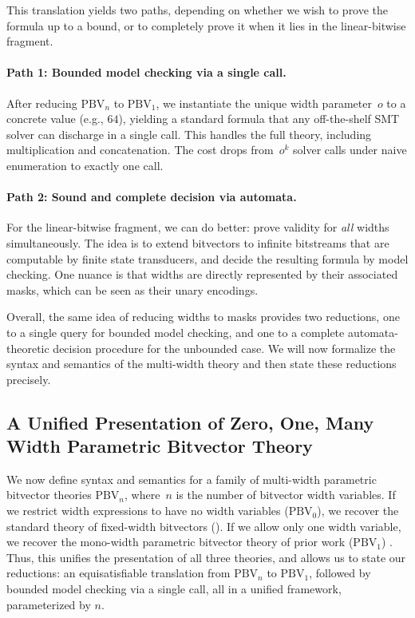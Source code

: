This translation yields two paths, depending on whether we wish to prove the
formula up to a bound, or to completely prove it when it lies in the
linear-bitwise fragment.

\paragraph{Path 1: Bounded model checking via a single \qfbv{} call.}
%
After reducing $\text{PBV}_n$ to $\text{PBV}_1$, we instantiate the unique
width parameter~$o$ to a concrete value (e.g., $64$), yielding a standard
\qfbv{} formula that any off-the-shelf SMT solver can discharge in a single
call.  This handles the full theory, including multiplication and
concatenation.  The cost drops from~$o^k$ solver calls under naive enumeration
to exactly one call.

\paragraph{Path 2: Sound and complete decision via automata.}
%
For the linear-bitwise fragment, we can do better: prove validity for \emph{all}
widths simultaneously.  The idea is to extend bitvectors to infinite bitstreams
that are computable by finite state transducers, and decide the resulting
formula by model checking. One nuance is that widths are directly represented by
their associated masks, which can be seen as their unary encodings.

\medskip
Overall, the same idea of reducing widths to masks provides two
reductions, one to a single \qfbv{} query for bounded model checking, and one to
a complete automata-theoretic decision procedure for the unbounded case. We will
now formalize the syntax and semantics of the multi-width theory and then state
these reductions precisely.


\subsection{A Unified Presentation of Zero, One, Many Width Parametric Bitvector Theory}
\label{sec:mwbv:theory}

We now define syntax and semantics for a family of multi-width
parametric bitvector theories $\text{PBV}_n$, where~$n$ is the number of
bitvector width variables.
%
If we restrict width expressions to have no width variables ($\text{PBV}_0$), we
recover the standard theory of fixed-width bitvectors (\qfbv{}). If we allow
only one width variable, we recover the mono-width parametric bitvector
theory of prior work ($\text{PBV}_1$) \cite{bhat2025certified}.
%
Thus, this unifies the presentation of all three theories, and allows us to
state our reductions: an equisatisfiable translation from $\text{PBV}_n$ to
$\text{PBV}_1$, followed by bounded model checking via a single \qfbv{}
call, all in a unified framework, parameterized by $n$.

